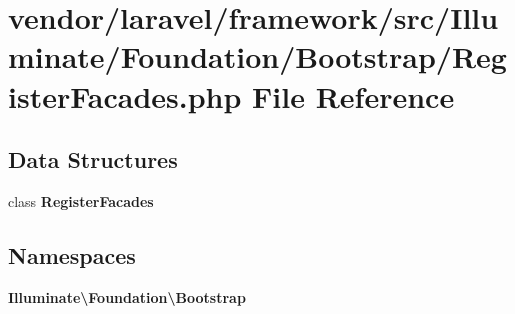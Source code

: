 \section{vendor/laravel/framework/src/\+Illuminate/\+Foundation/\+Bootstrap/\+Register\+Facades.php File Reference}
\label{_register_facades_8php}
\subsection*{Data Structures}
\begin{DoxyCompactItemize}
\item 
class {\bf Register\+Facades}
\end{DoxyCompactItemize}
\subsection*{Namespaces}
\begin{DoxyCompactItemize}
\item 
 {\bf Illuminate\textbackslash{}\+Foundation\textbackslash{}\+Bootstrap}
\end{DoxyCompactItemize}

